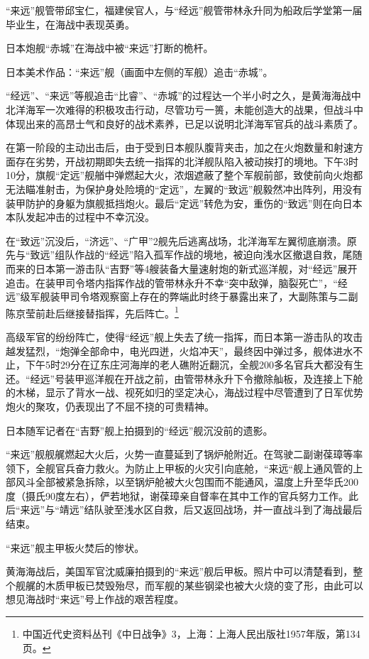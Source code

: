 \documentclass[12pt,UTF8]{ctexbook}
\begin{document}
“来远”舰管带邱宝仁，福建侯官人，与“经远”舰管带林永升同为船政后学堂第一届毕业生，在海战中表现英勇。

日本炮舰“赤城”在海战中被“来远”打断的桅杆。

日本美术作品：“来远”舰（画面中左侧的军舰）追击“赤城”。

“经远”、“来远”等舰追击“比睿”、“赤城”的过程达一个半小时之久，是黄海海战中北洋海军一次难得的积极攻击行动，尽管功亏一篑，未能创造大的战果，但战斗中体现出来的高昂士气和良好的战术素养，已足以说明北洋海军官兵的战斗素质了。

在第一阶段的主动出击后，由于受到日本舰队腹背夹击，加之在火炮数量和射速方面存在劣势，开战初期即失去统一指挥的北洋舰队陷入被动挨打的境地。下午3时10分，旗舰“定远”舰艏中弹燃起大火，浓烟遮蔽了整个军舰前部，致使前向火炮都无法瞄准射击，为保护身处险境的“定远”，左翼的“致远”舰毅然冲出阵列，用没有装甲防护的身躯为旗舰抵挡炮火。最后“定远”转危为安，重伤的“致远”则在向日本本队发起冲击的过程中不幸沉没。

在“致远”沉没后，“济远”、“广甲”2舰先后逃离战场，北洋海军左翼彻底崩溃。原先与“致远”组队作战的“经远”陷入孤军作战的境地，被迫向浅水区撤退自救，尾随而来的日本第一游击队“吉野”等4艘装备大量速射炮的新式巡洋舰，对“经远”展开追击。在装甲司令塔内指挥作战的管带林永升不幸“突中敌弹，脑裂死亡”，“经远”级军舰装甲司令塔观察窗上存在的弊端此时终于暴露出来了，大副陈策与二副陈京莹前赴后继接替指挥，先后阵亡。\footnote{中国近代史资料丛刊《中日战争》3，上海：上海人民出版社1957年版，第134页。}

高级军官的纷纷阵亡，使得“经远”舰上失去了统一指挥，而日本第一游击队的攻击越发猛烈，“炮弹全部命中，电光四迸，火焰冲天”，最终因中弹过多，舰体进水不止，下午5时29分在辽东庄河海岸的老人礁附近翻沉，全舰200多名官兵大都没有生还。“经远”号装甲巡洋舰在开战之前，由管带林永升下令撤除舢板，及连接上下舱的木梯，显示了背水一战、视死如归的坚定决心，海战过程中尽管遭到了日军优势炮火的聚攻，仍表现出了不屈不挠的可贵精神。

日本随军记者在“吉野”舰上拍摄到的“经远”舰沉没前的遗影。

“来远”舰舰艉燃起大火后，火势一直蔓延到了锅炉舱附近。在驾驶二副谢葆璋等率领下，全舰官兵奋力救火。为防止上甲板的火灾引向底舱，“来远“舰上通风管的上部风斗全部被紧急拆除，以至锅炉舱被大火包围而不能通风，温度上升至华氏200度（摄氏90度左右），俨若地狱，谢葆璋亲自督率在其中工作的官兵努力工作。此后“来远”与“靖远”结队驶至浅水区自救，后又返回战场，并一直战斗到了海战最后结束。

“来远”舰主甲板火焚后的惨状。

黄海海战后，美国军官沈威廉拍摄到的“来远”舰后甲板。照片中可以清楚看到，整个舰艉的木质甲板已焚毁殆尽，而军舰的某些钢梁也被大火烧的变了形，由此可以想见海战时“来远”号上作战的艰苦程度。
\end{document}
